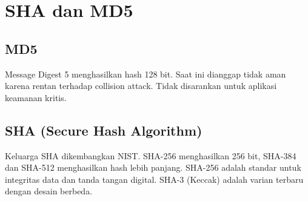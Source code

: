 \section{SHA dan MD5}

\subsection{MD5}
Message Digest 5 menghasilkan hash 128 bit. Saat ini dianggap tidak aman karena rentan terhadap collision attack. Tidak disarankan untuk aplikasi keamanan kritis.

\subsection{SHA (Secure Hash Algorithm)}
Keluarga SHA dikembangkan NIST. SHA-256 menghasilkan 256 bit, SHA-384 dan SHA-512 menghasilkan hash lebih panjang. SHA-256 adalah standar untuk integritas data dan tanda tangan digital. SHA-3 (Keccak) adalah varian terbaru dengan desain berbeda.
